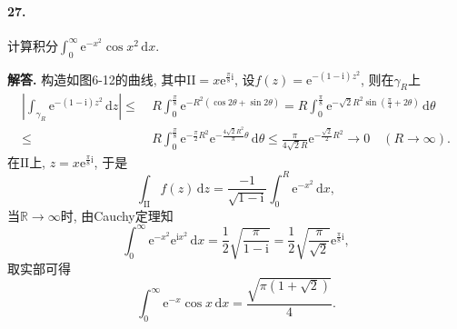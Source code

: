 \documentclass[12pt, a4paper, oneside]{ctexart}
\newenvironment{solution}{\par\noindent\textbf{解答. }}{\bigskip\par}
\let\leq=\leqslant %
\def\R{\mathbb{R}}      %
\def\d{\mathrm{d}}      %
\def\e{\mathrm{e}}      %
\def\i{\mathrm{i}}      %
\begin{document}
\paragraph{27.}计算积分$\int_0^\infty\e^{-x^2}\cos x^2\,\d x$.
\begin{solution}
    构造如图6-12的曲线, 其中$\mathrm{II} = x\e^{\frac{\pi}{8}\i}$, 设$f(z) = \e^{-(1-\i)z^2}$, 则在$\gamma_R$上
    \begin{align*}
        \left|\int_{\gamma_R}\e^{-(1-\i)z^2}\,\d z\right|\leq&\ R\int_0^{\frac{\pi}{8}}\e^{-R^2(\cos2\theta+\sin2\theta)} =R\int_0^{\frac{\pi}{8}}\e^{-\sqrt{2}R^2\sin(\frac{\pi}{4}+2\theta)}\,\d \theta\\
        \leq&\ R\int_0^{\frac{\pi}{8}}\e^{-\frac{\pi}{2}R^2}\e^{-\frac{4\sqrt{2}R^2}{\pi}\theta}\,\d \theta\leq \frac{\pi}{4\sqrt{2}R}\e^{-\frac{\sqrt{2}}{2}R^2} \to 0\quad(R\to\infty).
    \end{align*}
    在$\mathrm{II}$上, $z = x\e^{\frac{\pi}{8}\i}$, 于是
    \begin{equation*}
        \int_{\mathrm{II}}f(z)\,\d z = \frac{-1}{\sqrt{1-\i}}\int_0^R\e^{-x^2}\,\d x,
    \end{equation*}
    当$\R\to\infty$时, 由Cauchy定理知
    \begin{equation*}
        \int_0^{\infty}\e^{-x^2}\e^{\i x^2}\,\d x = \frac{1}{2}\sqrt{\frac{\pi}{1-\i}} = \frac{1}{2}\sqrt{\frac{\pi}{\sqrt{2}}}\e^{\frac{\pi}{8}\i},
    \end{equation*}
    取实部可得
    \begin{equation*}
        \int_0^\infty\e^{-x}\cos x\,\d x = \frac{\sqrt{\pi(1+\sqrt{2})}}{4}.
    \end{equation*}
\end{solution}

\end{document}
